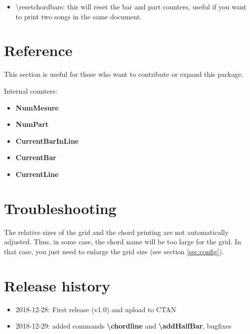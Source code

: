 \documentclass[11pt]{article}
\newcommand{\btt}{\bfseries \ttfamily }
\newcommand{\tbs}{\textbackslash{}}
\begin{document}
\begin{itemize}
\noindent
\begin{minipage}{0.45\textwidth}

\end{minipage}
%
\begin{minipage}{0.42\textwidth}

\end{minipage}

\item {\ttfamily \textbackslash resetchordbars}: this will reset the bar and part counters, useful if you want to print two songs in the same document.
\end{itemize}


\section{Reference}

This section is useful for those who want to contribute or expand this package.

Internal counters:

\begin{itemize}
\item {\btt NumMesure}
\item {\btt NumPart}
\item {\btt CurrentBarInLine}
\item {\btt CurrentBar}
\item {\btt CurrentLine}
\end{itemize}

\section{Troubleshooting}

The relative sizes of the grid and the chord printing are not automatically adjusted.
Thus, in some case, the chord name will be too large for the grid.
In that case, you just need to enlarge the grid size (see section \ref {sec:config}).

\section{Release history}

\begin{itemize}
\item 2018-12-28: First release (v1.0) and upload to CTAN

\item 2018-12-29: added commands {\btt \tbs chordline} and {\btt \tbs addHalfBar}, bugfixes
\end{itemize}
\end{document}
